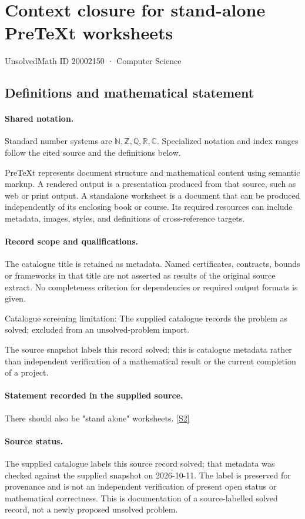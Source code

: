 \documentclass[11pt]{article}
\newcommand{\sref}[2]{\hyperlink{source:#1:#2}{[S#2]}}
\begin{document}
\setcounter{section}{20002149}
\section{Context closure for stand-alone PreTeXt worksheets}\label{20002150}
{\small\sffamily UnsolvedMath ID 20002150 · Computer Science}
\subsection{Definitions and mathematical statement}

\paragraph{Shared notation.}Standard number systems are $\mathbb N,\mathbb Z,\mathbb Q,\mathbb R,\mathbb C$. Specialized notation and index ranges follow the cited source and the definitions below.


PreTeXt represents document structure and mathematical content using semantic markup. A rendered output is a presentation produced from that source, such as web or print output. A standalone worksheet is a document that can be produced independently of its enclosing book or course. Its required resources can include metadata, images, styles, and definitions of cross-reference targets.
\paragraph{Record scope and qualifications.}
The catalogue title is retained as metadata. Named certificates, contracts, bounds or frameworks in that title are not asserted as results of the original source extract.
No completeness criterion for dependencies or required output formats is given.

Catalogue screening limitation: The supplied catalogue records the problem as solved; excluded from an unsolved-problem import.

The source snapshot labels this record solved; this is catalogue metadata rather than independent verification of a mathematical result or the current completion of a project.
\paragraph{Statement recorded in the supplied source.}
There should also be "stand alone" worksheets. \sref{20002150}{2}
\paragraph{Source status.}
The supplied catalogue labels this source record solved; that metadata was checked against the supplied snapshot on 2026-10-11. The label is preserved for provenance and is not an independent verification of present open status or mathematical correctness. This is documentation of a source-labelled solved record, not a newly proposed unsolved problem.
\end{document}
